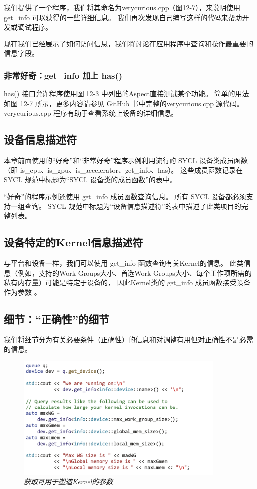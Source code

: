 我们提供了一个程序，我们将其命名为verycurious.cpp（图12-7），来说明使用get\_info 可以获得的一些详细信息。 
我们再次发现自己编写这样的代码来帮助开发或调试程序。

现在我们已经展示了如何访问信息，我们将讨论在应用程序中查询和操作最重要的信息字段。

\subsubsection{非常好奇：get\_info 加上 has()}
has() 接口允许程序使用图 12-3 中列出的Aspect直接测试某个功能。 
简单的用法如图 12-7 所示，更多内容请参见 GitHub 书中完整的verycurious.cpp 源代码。
 verycurious.cpp 程序有助于查看系统上设备的详细信息。

\subsection{设备信息描述符}
本章前面使用的“好奇”和“非常好奇”程序示例利用流行的 SYCL 设备类成员函数
（即 is\_cpu、is\_gpu、is\_accelerator、get\_info、has）。 
这些成员函数记录在 SYCL 规范中标题为“SYCL 设备类的成员函数”的表中。

“好奇”的程序示例还使用 get\_info 成员函数查询信息。 所有 SYCL 设备都必须支持一组查询。 
SYCL 规范中标题为“设备信息描述符”的表中描述了此类项目的完整列表。

\subsection{设备特定的Kernel信息描述符}
与平台和设备一样，我们可以使用 get\_info 函数查询有关Kernel的信息。 
此类信息（例如，支持的Work-Groups大小、首选Work-Groups大小、每个工作项所需的私有内存量）可能是特定于设备的，
因此Kernel类的 get\_info 成员函数接受设备作为参数 。

\subsection{细节：“正确性”的细节}
我们将细节分为有关必要条件（正确性）的信息和对调整有用但对正确性不是必需的信息。

\begin{figure}[H]
	\centering
	\includegraphics[width=0.9\textwidth]{figs/F12.8.png}
	\caption{\textit{获取可用于塑造Kernel的参数 }}
\end{figure}

